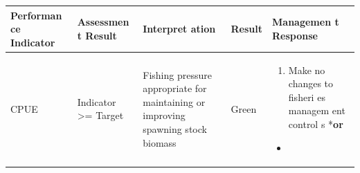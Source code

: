 \documentclass[]{book}
\providecommand{\tightlist}{%
  \setlength{\itemsep}{0pt}\setlength{\parskip}{0pt}}
\begin{document}
\begin{longtable}[]{@{}lllll@{}}
\toprule
\begin{minipage}[b]{0.17\columnwidth}\raggedright\strut
\textbf{Performan ce Indicator}\strut
\end{minipage} & \begin{minipage}[b]{0.17\columnwidth}\raggedright\strut
\textbf{Assessmen t Result}\strut
\end{minipage} & \begin{minipage}[b]{0.17\columnwidth}\raggedright\strut
\textbf{Interpret ation}\strut
\end{minipage} & \begin{minipage}[b]{0.17\columnwidth}\raggedright\strut
\textbf{Result}\strut
\end{minipage} & \begin{minipage}[b]{0.17\columnwidth}\raggedright\strut
\textbf{Managemen t Response}\strut
\end{minipage}\tabularnewline
\midrule
\endhead
\begin{minipage}[t]{0.19\columnwidth}\raggedright\strut
CPUE\strut
\end{minipage} & \begin{minipage}[t]{0.19\columnwidth}\raggedright\strut
Indicator \textgreater{}= Target\strut
\end{minipage} & \begin{minipage}[t]{0.19\columnwidth}\raggedright\strut
Fishing pressure appropriate for maintaining or improving spawning stock
biomass\strut
\end{minipage} & \begin{minipage}[t]{0.19\columnwidth}\raggedright\strut
Green\strut
\end{minipage} & \begin{minipage}[t]{0.19\columnwidth}\raggedright\strut
\begin{enumerate}
\def\labelenumi{\arabic{enumi}.}
\tightlist
\item
  Make no changes to fisheri es managem ent control s *\textbf{or}
\end{enumerate}

\begin{itemize}
\item
\end{itemize}


\end{minipage}
\end{longtable}
\end{document}
